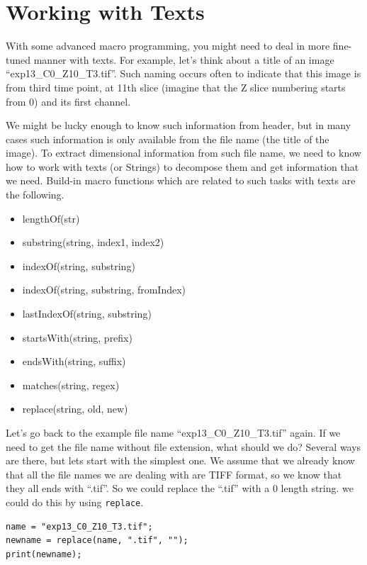 \documentclass[11pt,a4paper,oneside]{report}
\newcommand{\ilcom}[1]{\texttt{\small#1}}
\begin{document}
\section{Working with Texts}

With some advanced macro programming, you might need to deal in more fine-tuned manner with texts. For example, let's think about a title of an image ``exp13\_C0\_Z10\_T3.tif''. Such naming occurs often to indicate that this image is from third time point, at 11th slice (imagine that the Z slice numbering starts from 0) and its first channel. 

We might be lucky enough to know such information from header, but in many cases such information is only available from the file name (the title of the image). To extract dimensional information from such file name, we need to know how to work with texts (or Strings) to decompose them and get information that we need. Build-in macro functions which are related to such tasks with texts are the following. 

\begin{itemize}
\item lengthOf(str)
\item substring(string, index1, index2)
\item indexOf(string, substring)
\item indexOf(string, substring, fromIndex)
\item lastIndexOf(string, substring)
\item startsWith(string, prefix)
\item endsWith(string, suffix)
\item matches(string, regex)
\item replace(string, old, new)
\end{itemize}

Let's go back to the example file name ``exp13\_C0\_Z10\_T3.tif'' again. If we need to get the file name without file extension, what should we do? Several ways are there, but lets start with the simplest one. We assume that we already know that all the file names we are dealing with are TIFF format, so we know that they all ends with ``.tif''. So we could replace the ``.tif'' with a 0 length string. we could do this by using \ilcom{replace}. 

\begin{lstlisting}
name = "exp13_C0_Z10_T3.tif";
newname = replace(name, ".tif", "");
print(newname);
\end{lstlisting}
\end{document}
